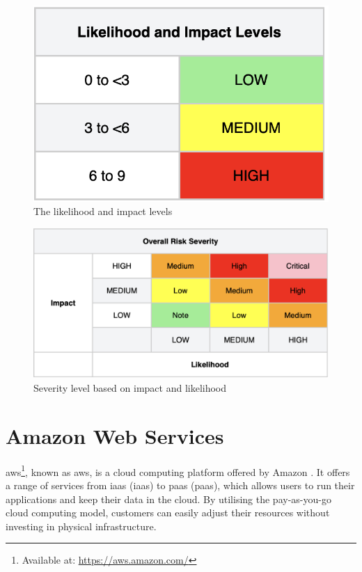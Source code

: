 \vspace{2mm}
\begin{figure}[H]
    \centering
    \includegraphics[scale=0.5]{Images/OWASP-likelihood.png}
    \caption{The likelihood and impact levels}
    \label{fig: Impact levels}
\end{figure}

\vspace{2mm}
\begin{figure}[H]
    \centering
    \includegraphics[scale=0.4]{Images/OWASP-severity.png}
    \caption{Severity level based on impact and likelihood}
    \label{fig: OWASP Severity Scale}
\end{figure}

\section{Amazon Web Services}
\acrlong{aws}\footnote{Available at: \url{https://aws.amazon.com/}}, known as \acrshort{aws}, is a cloud computing platform offered by Amazon \cite{aws}. It offers a range of services from \acrlong{iaas} (\acrshort{iaas}) to \acrlong{paas} (\acrshort{paas}), which allows users to run their applications and keep their data in the cloud. By utilising the pay-as-you-go cloud computing model, customers can easily adjust their resources without investing in physical infrastructure.
\newpage
